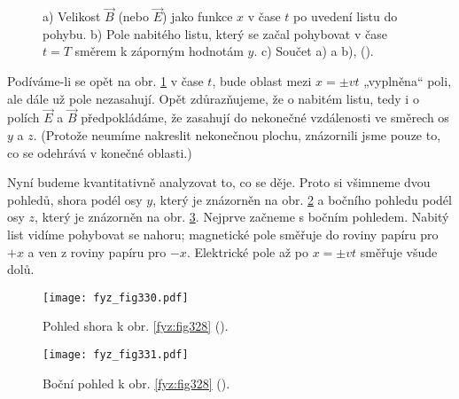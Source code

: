   \begin{figure}[hb!] %
    \centering
                  \newline
                  \newline
    \caption{a) Velikost \(\vec{B}\) (nebo \(\vec{E}\)) jako funkce \(x\) v čase \(t\) po uvedení 
             listu do pohybu. b) Pole nabitého listu, který se začal pohybovat v čase \(t = T\) 
             směrem k záporným hodnotám \(y\). c) Součet a) a b),
             (\cite[s.~324]{Feynman02}).}
    \label{fyz:fig329}
  \end{figure}
  
  Podíváme-li se opět na obr. \ref{fyz:fig329} v čase \(t\), bude oblast mezi \(x = \pm vt\) 
  „vyplněna“ poli, ale dále už pole nezasahují. Opět zdůrazňujeme, že o nabitém listu, tedy i o 
  polích \(\vec{E}\) a \(\vec{B}\) předpokládáme, že zasahují do nekonečné vzdálenosti ve směrech 
  os \(y\) a \(z\). (Protože neumíme nakreslit nekonečnou plochu, znázornili jsme pouze to, co se 
  odehrává v konečné oblasti.)
  
  Nyní budeme kvantitativně analyzovat to, co se děje. Proto si všimneme dvou pohledů, shora podél 
  osy \(y\), který je znázorněn na obr. \ref{fyz:fig330} a bočního pohledu podél osy \(z\), který 
  je znázorněn na obr. \ref{fyz:fig331}. Nejprve začneme s bočním pohledem. Nabitý list vidíme 
  pohybovat se nahoru; magnetické pole směřuje do roviny papíru pro \(+x\) a ven z roviny papíru 
  pro \(-x\). Elektrické pole až po \(x=\pm vt\) směřuje všude dolů.

  \begin{figure}[ht!]  %
    \centering
    \texttt{[image: fyz\_fig330.pdf]}
    \caption{Pohled shora k obr. \ref{fyz:fig328}
             (\cite[s.~320]{Feynman02}).}
    \label{fyz:fig330}
  \end{figure}
  
  \begin{figure}[ht!]  %
    \centering
    \texttt{[image: fyz\_fig331.pdf]}
    \caption{Boční pohled k obr. \ref{fyz:fig328}
             (\cite[s.~331]{Feynman02}).}
    \label{fyz:fig331}
  \end{figure}

